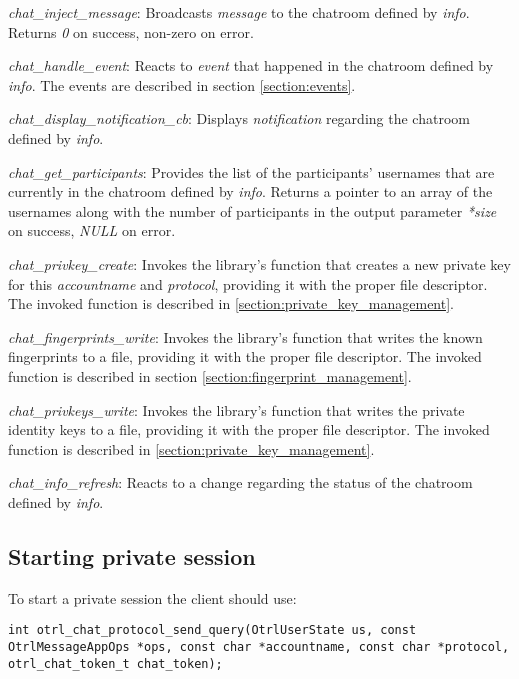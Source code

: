 \begin{description}
  \item \emph{chat\_inject\_message}: Broadcasts \emph{message} to the chatroom defined by \emph{info}. Returns \emph{0} on success, non-zero on error.

  \item \emph{chat\_handle\_event}: Reacts to \emph{event} that happened in the chatroom defined by \emph{info}. The events are described in section \ref{section:events}.

  \item \emph{chat\_display\_notification\_cb}: Displays \emph{notification} regarding the chatroom defined by \emph{info}.
  
  \item \emph{chat\_get\_participants}: Provides the list of the participants' usernames that are currently in the chatroom defined by \emph{info}. Returns a pointer to an array of the usernames along with the number of participants in the output parameter \emph{*size} on success, \emph{NULL} on error.
    
  \item \emph{chat\_privkey\_create}: Invokes the library's function that creates a new private key for this \emph{accountname} and \emph{protocol}, providing it with the proper file descriptor. The invoked function is described in \ref{section:private_key_management}.

  \item \emph{chat\_fingerprints\_write}: Invokes the library's function that writes the known fingerprints to a file, providing it with the proper file descriptor. The invoked function is described in section \ref{section:fingerprint_management}.
  
  \item \emph{chat\_privkeys\_write}: Invokes the library's function that writes the private identity keys to a file, providing it with the proper file descriptor. The invoked function is described in \ref{section:private_key_management}.

  \item \emph{chat\_info\_refresh}: Reacts to a change regarding the status of the chatroom defined by \emph{info}.
  
\end{description}

\subsection{Starting private session}
To start a private session the client should use:
\begin{lstlisting}[caption={The private session initiation function}]
int otrl_chat_protocol_send_query(OtrlUserState us, const OtrlMessageAppOps *ops, const char *accountname, const char *protocol, otrl_chat_token_t chat_token);
\end{lstlisting}

